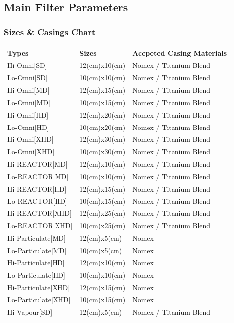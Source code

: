 \documentclass[a4paper, 12pt]{article}
\begin{document}
{		\subsection{Main Filter Parameters}
			\subsubsection{Sizes \& Casings Chart}
				\begin{tabular}{|p{4cm}||p{3cm}|p{5.45cm}|}
					\hline
					Types & Sizes & Accpeted Casing Materials \\\hline
					Hi-Omni[SD] & 12(cm)x10(cm) & Nomex / Titanium Blend \\
					Lo-Omni[SD] & 10(cm)x10(cm) & Nomex / Titanium Blend \\
					Hi-Omni[MD] & 12(cm)x15(cm) & Nomex / Titanium Blend \\
					Lo-Omni[MD] & 10(cm)x15(cm) & Nomex / Titanium Blend \\
					Hi-Omni[HD] & 12(cm)x20(cm) & Nomex / Titanium Blend \\
					Lo-Omni[HD] & 10(cm)x20(cm) & Nomex / Titanium Blend \\
					Hi-Omni[XHD] & 12(cm)x30(cm) & Nomex / Titanium Blend \\
					Lo-Omni[XHD] & 10(cm)x30(cm) & Nomex / Titanium Blend \\
					Hi-REACTOR[MD] & 12(cm)x10(cm) & Nomex / Titanium Blend \\
					Lo-REACTOR[MD] & 10(cm)x10(cm) & Nomex / Titanium Blend \\
					Hi-REACTOR[HD] & 12(cm)x15(cm) & Nomex / Titanium Blend \\
					Lo-REACTOR[HD] & 10(cm)x15(cm) & Nomex / Titanium Blend \\
					Hi-REACTOR[XHD] & 12(cm)x25(cm) & Nomex / Titanium Blend \\
					Lo-REACTOR[XHD] & 10(cm)x25(cm) & Nomex / Titanium Blend \\
					Hi-Particulate[MD] & 12(cm)x5(cm) & Nomex \\
					Lo-Particulate[MD] & 10(cm)x5(cm) & Nomex \\
					Hi-Particulate[HD] & 12(cm)x10(cm) & Nomex \\
					Lo-Particulate[HD] & 10(cm)x10(cm) & Nomex \\
					Hi-Particulate[XHD] & 12(cm)x15(cm) & Nomex \\
					Lo-Particulate[XHD] & 10(cm)x15(cm) & Nomex \\
					Hi-Vapour[SD] & 12(cm)x5(cm) & Nomex / Titanium Blend \\

\end{tabular}}
\end{document}
